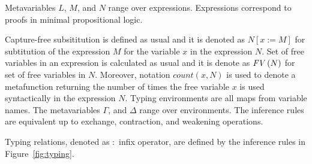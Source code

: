\documentclass[a4paper]{article}
\newcommand{\sbs}[3]{#1[#2:=#3]}
\newcommand{\fv}[1]{\txt{FV}\,(#1)}
\newcommand{\txt}[1]{\text{\textit{#1}}}
\begin{document}
Metavariables $L$, $M$, and $N$ range over expressions. Expressions
correspond to proofs in minimal propositional logic.


Capture-free subsititution is defined as usual and it is denoted as
$\sbs{N}{x}{M}$ for subtitution of the expression $M$ for the variable
$x$ in the expression $N$. Set of free variables in an expression is
calculated as usual and it is denote as $\fv{N}$ for set of free
variables in $N$. Moreover, notation $count(x,N)$ is used to denote a
metafunction returning the number of times the free variable $x$ is
used syntactically in the expression $N$.
Typing %
 environments are all maps from
variable names. The metavariables $\Gamma$, and $\Delta$ range over
environments.  The inference rules are equivalent up to exchange,
contraction, and weakening operations. 

Typing relations, denoted as $:$ infix operator, are defined by
the inference rules in Figure~\ref{fig:typing}.
\end{document}
